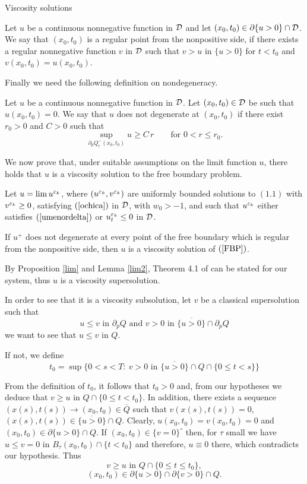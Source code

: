 \begin{section}{Viscosity solutions}
\begin{defi}
Let $u$ be a continuous nonnegative function in $\cal D$ and let 
$(x_0,t_0)\in\partial\{ u>0 \}\cap \cal D$. We say that $(x_0,t_0)$ is a regular 
point from the nonpositive side, if there exists a regular nonnegative
function $v$ in
$\cal D$ such that $v>u$ in $\{u>0\}$ for $t<t_0$ and $v(x_0,t_0)=u(x_0,t_0)$.
\end{defi}

Finally we need the following definition on nondegeneracy.

\begin{defi}
Let $u$ be a continuous nonnegative function in ${\cal D}$. Let $(x_0,t_0)\in{\cal D}$
be such that $u(x_0,t_0)=0$. We say that $u$ does not degenerate at $(x_0,t_0)$
if there exist $r_0>0$ and $C>0$ such that
$$
\sup_{\partial_p Q_r^-(x_0,t_0)}u\ge C\,r\qquad\mbox{for }0<r\le r_0.
$$
\end{defi}

We now prove that, under suitable assumptions on the limit function $u$, 
there holds that $u$ is a viscosity solution to the free boundary problem.

\begin{teo} 
\label{viscosa}
Let $u=\lim u^{\varepsilon_k}$, where $(u^{\varepsilon_k},v^{\varepsilon_k})$ are uniformly
bounded solutions to $(1.1)$ with   $v^{\varepsilon_k}\ge0$, satisfying
$(\ref{ochica})$ 
in $\cal D$, with $w_0>-1$,  and such that $u^{\varepsilon_k}$ either satisfies $(\ref{umenordelta})$
or $u^{\varepsilon_k}_t\le 0$ in ${\cal D}$.

 If $u^+$ does not degenerate at every point of the free 
boundary which is regular from the nonpositive side, then $u$ is a viscosity 
solution of $(\ref{FBP})$.
\end{teo}

\begin{pf}

By Proposition \ref{lim} and Lemma \ref{lim2}, Theorem 4.1 of \cite{CLW2}
can be stated for our system, thus $u$ is a viscosity supersolution.

In order to see that it is a viscosity  subsolution, let $v$ be a classical
supersolution such that
$$u\le v \mbox{ in } \partial_p Q \mbox{ and } v>0 \mbox{ in }
\overline{\{u>0\}}\cap\partial_pQ$$
we want to see that $u\le v$ in $Q$.

\medskip

If not, we define
$$t_0 = \sup\{ 0<s<T:\ v>0 \mbox{ in } \overline{\{ u>0 \}}\cap Q\cap
\{ 0\le t<s \}\}$$

From the definition of $t_0$, it follows that $t_0>0$ and, from our
hypotheses we deduce that $v\ge u$ in
$Q\cap\{ 0\le t<t_0 \}$. In addition, there exists a sequence $(x(s),t(s))\to
(x_0,t_0)\in \overline{Q}$ such that $v(x(s),t(s)) = 0$, $(x(s),t(s))\in
\overline{\{ u>0 \}}\cap Q$. Clearly, $u(x_0,t_0) = v(x_0,t_0) = 0$ and 
$(x_0,t_0)\in\partial\{ u>0 \}\cap Q$. If $(x_0,t_0)\in \{ v = 0 \}^\circ$ 
then, for $\tau$ small we have $u\le v = 0$ in $B_{\tau}(x_0,t_0)\cap
\{ t<t_0 \}$ and therefore, $u\equiv 0$ there, which contradicts our 
hypothesis. Thus
$$v\ge u \mbox{ in } Q\cap \{ 0\le t\le t_0 \},$$
$$(x_0,t_0)\in \partial\{ u>0 \}\cap \partial\{ v>0 \}\cap Q.$$ 


\end{pf}
\end{section}
